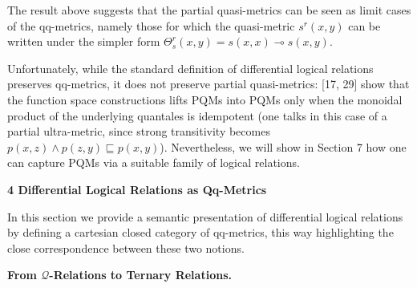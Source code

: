  
 
 
The result above suggests that the partial quasi-metrics can be seen as limit cases of the qq-metrics, namely those for which the quasi-metric $s^{r}(x,y)$ can be written under the simpler form $\Theta^{r}_{s}(x,y)=s(x,x)\multimap s(x,y)$.\par
 
 
 
Unfortunately, while the standard definition of differential logical relations preserves qq-metrics, it does not preserve partial quasi-metrics: [17, 29] show that the function space constructions lifts PQMs into PQMs only when the monoidal product of the underlying quantales is idempotent (one talks in this case of a partial ultra-metric, since strong transitivity becomes $p(x,z)\land p(z,y)\sqsubseteq p(x,y)$). Nevertheless, we will show in Section 7 how one can capture PQMs via a suitable family of logical relations.\par
 
 
 


 
\par\medskip\noindent\textbf{4 Differential Logical Relations as Qq-Metrics}\par
 
 
In this section we provide a semantic presentation of differential logical relations by defining a cartesian closed category of qq-metrics, this way highlighting the close correspondence between these two notions.\par
 
 
 
\par\medskip\noindent\textbf{From $\mathcal{Q}$-Relations to Ternary Relations.}\par
 
 
